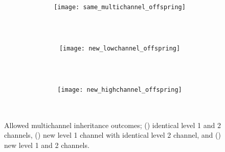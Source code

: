 \begin{figure}
  \begin{subfigure}[b]{0.85\textwidth}
    \begin{columns}
    \begin{column}{0.05\textwidth}
      \caption{}~\\\vspace{0ex}~\\
      \label{fig:same_multichannel_offspring}
    \end{column}
    \begin{column}{0.95\textwidth}
      \colorbox{extralightgray}{\texttt{[image: same\_multichannel\_offspring]}}
  \end{column}
\end{columns}
  \end{subfigure}
  \begin{subfigure}[b]{0.85\textwidth}
      \begin{columns}
      \begin{column}{0.05\textwidth}
        \caption{}~\\\vspace{0ex}~\\
        \label{fig:new_lowchannel_offspring}
      \end{column}
      \begin{column}{0.95\textwidth}
        \colorbox{extralightgray}{\texttt{[image: new\_lowchannel\_offspring]}}
\end{column}
\end{columns}
  \end{subfigure}
  \begin{subfigure}[b]{0.85\textwidth}
      \begin{columns}
      \begin{column}{0.05\textwidth}
      \caption{}~\\\vspace{0ex}~\\
      \label{fig:new_highchannel_offspring}
      \end{column}
      \begin{column}{0.95\textwidth}
        \colorbox{extralightgray}{\texttt{[image: new\_highchannel\_offspring]}\vspace{-10ex}}
\end{column}
\end{columns}
  \end{subfigure}
  \caption{
  Allowed multichannel inheritance outcomes;
  () identical level 1 and 2 channels,
  () new level 1 channel with identical level 2 channel, and
  () new level 1 and 2 channels.
  }
\end{figure}
